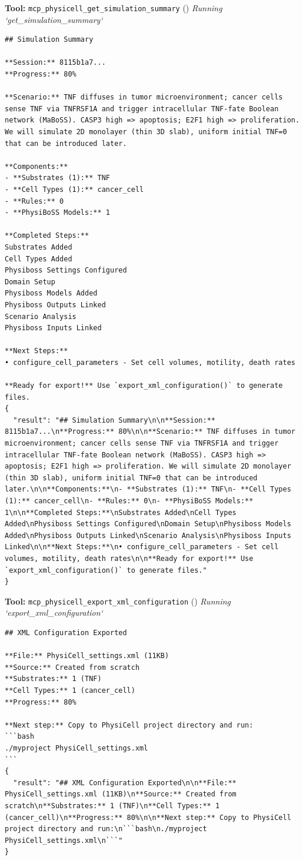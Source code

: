 \documentclass[11pt,a4paper]{article}
\begin{document}
\begin{toolokbox}
\textbf{Tool:} \texttt{mcp\_physicell\_get\_simulation\_summary} (\checkmark)
\textit{Running `get\_simulation\_summary`}
\begin{lstlisting}
## Simulation Summary

**Session:** 8115b1a7...
**Progress:** 80%

**Scenario:** TNF diffuses in tumor microenvironment; cancer cells sense TNF via TNFRSF1A and trigger intracellular TNF-fate Boolean network (MaBoSS). CASP3 high => apoptosis; E2F1 high => proliferation. We will simulate 2D monolayer (thin 3D slab), uniform initial TNF=0 that can be introduced later.

**Components:**
- **Substrates (1):** TNF
- **Cell Types (1):** cancer_cell
- **Rules:** 0
- **PhysiBoSS Models:** 1

**Completed Steps:**
Substrates Added
Cell Types Added
Physiboss Settings Configured
Domain Setup
Physiboss Models Added
Physiboss Outputs Linked
Scenario Analysis
Physiboss Inputs Linked

**Next Steps:**
• configure_cell_parameters - Set cell volumes, motility, death rates

**Ready for export!** Use `export_xml_configuration()` to generate files.
{
  "result": "## Simulation Summary\n\n**Session:** 8115b1a7...\n**Progress:** 80%\n\n**Scenario:** TNF diffuses in tumor microenvironment; cancer cells sense TNF via TNFRSF1A and trigger intracellular TNF-fate Boolean network (MaBoSS). CASP3 high => apoptosis; E2F1 high => proliferation. We will simulate 2D monolayer (thin 3D slab), uniform initial TNF=0 that can be introduced later.\n\n**Components:**\n- **Substrates (1):** TNF\n- **Cell Types (1):** cancer_cell\n- **Rules:** 0\n- **PhysiBoSS Models:** 1\n\n**Completed Steps:**\nSubstrates Added\nCell Types Added\nPhysiboss Settings Configured\nDomain Setup\nPhysiboss Models Added\nPhysiboss Outputs Linked\nScenario Analysis\nPhysiboss Inputs Linked\n\n**Next Steps:**\n• configure_cell_parameters - Set cell volumes, motility, death rates\n\n**Ready for export!** Use `export_xml_configuration()` to generate files."
}
\end{lstlisting}
\end{toolokbox}
\begin{toolokbox}
\textbf{Tool:} \texttt{mcp\_physicell\_export\_xml\_configuration} (\checkmark)
\textit{Running `export\_xml\_configuration`}
\begin{lstlisting}
## XML Configuration Exported

**File:** PhysiCell_settings.xml (11KB)
**Source:** Created from scratch
**Substrates:** 1 (TNF)
**Cell Types:** 1 (cancer_cell)
**Progress:** 80%

**Next step:** Copy to PhysiCell project directory and run:
```bash
./myproject PhysiCell_settings.xml
```
{
  "result": "## XML Configuration Exported\n\n**File:** PhysiCell_settings.xml (11KB)\n**Source:** Created from scratch\n**Substrates:** 1 (TNF)\n**Cell Types:** 1 (cancer_cell)\n**Progress:** 80%\n\n**Next step:** Copy to PhysiCell project directory and run:\n```bash\n./myproject PhysiCell_settings.xml\n```"
}
\end{lstlisting}
\end{toolokbox}
\end{document}
